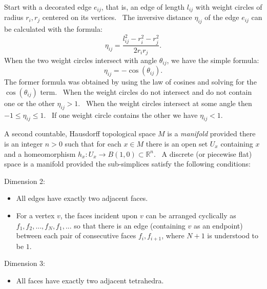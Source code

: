 \begin{description}
\item[inversive distance] Start with a decorated edge $e_{ij}$, that is, an
edge of length $l_{ij}$ with weight circles of radius $r_{i},r_{j}$ centered
on its vertices. \ The inversive distance $\eta _{ij}$ of the edge $e_{ij}$
can be calculated with the formula:%
\begin{equation*}
\eta _{ij}=\frac{l_{ij}^{2}-r_{i}^{2}-r_{j}^{2}}{2r_{i}r_{j}}.
\end{equation*}%
When the two weight circles intersect with angle $\theta _{ij}$, we have the
simple formula:%
\begin{equation*}
\eta _{ij}=-\cos \left( \theta _{ij}\right) .
\end{equation*}%
The former formula was obtained by using the law of cosines and solving for
the $\cos \left( \theta _{ij}\right) $ term. \ When the weight circles do
not intersect and do not contain one or the other $\eta _{ij}>1$. \ When the
weight circles intersect at some angle then $-1\leq \eta _{ij}\leq 1$. \ If
one weight circle contains the other we have $\eta _{ij}<1$. \ 

\item[manifold] A second countable, Hausdorff topological space $M$ is a 
\textit{manifold} provided there is an integer $n>0$ such that for each $%
x\in M$ there is an open set $U_{x}$ containing $x$ and a homeomorphism $%
h_{x}:U_{x}\rightarrow B\left( 1,0\right) \subset 
\mathbb{R}
^{n}$. \ A discrete (or piecewise flat) space is a manifold provided the
sub-simplices satisfy the following conditions:

\item Dimension 2:

\begin{itemize}
\item All edges have exactly two adjacent faces.

\item For a vertex $v$, the faces incident upon $v$ can be arranged
cyclically as $f_{1},f_{2},...,f_{N},f_{1},...$ so that there is an edge
(containing $v$ as an endpoint) between each pair of consecutive faces $%
f_{i},f_{i+1}$, where $N+1$ is understood to be $1$. \ 
\end{itemize}

\item Dimension 3:

\begin{itemize}
\item All faces have exactly two adjacent tetrahedra.


\end{itemize}
\end{description}
